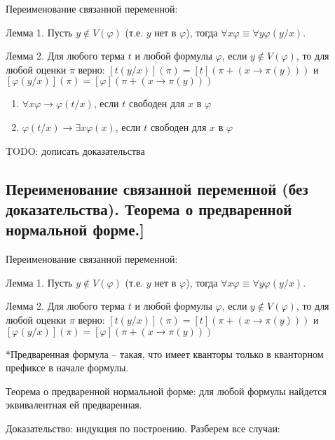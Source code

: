 \documentclass[a4paper, 10pt]{article}
\begin{document}
\hfill

Переименование связанной переменной:

Лемма 1. Пусть $y\not\in V(\varphi)$ (т.е. $y$ нет в $\varphi$), тогда $\forall x\varphi \equiv \forall y\varphi(y/x)$.

Лемма 2. Для любого терма $t$ и любой формулы $\varphi$, если $y \not\in V(\varphi)$, то для любой оценки $\pi$ верно: $[t(y/x)](\pi)=[t](\pi + (x \to \pi(y)))$ и $[\varphi(y/x)](\pi)=[\varphi](\pi + (x \to \pi(y)))$

\hfill

\begin{enumerate}
    \item $\forall x\varphi \to \varphi(t/x)$, если $t$ свободен для $x$ в $\varphi$
    \item $\varphi(t/x) \to \exists x \varphi(x)$, если $t$ свободен для $x$ в $\varphi$
\end{enumerate}

\hfill

TODO: дописать доказательства

\subsection{Переименование связанной переменной (без доказательства). Теорема о предваренной нормальной форме.]}

Переименование связанной переменной:

Лемма 1. Пусть $y\not\in V(\varphi)$ (т.е. $y$ нет в $\varphi$), тогда $\forall x\varphi \equiv \forall y\varphi(y/x)$.

Лемма 2. Для любого терма $t$ и любой формулы $\varphi$, если $y \not\in V(\varphi)$, то для любой оценки $\pi$ верно: $[t(y/x)](\pi)=[t](\pi + (x \to \pi(y)))$ и $[\varphi(y/x)](\pi)=[\varphi](\pi + (x \to \pi(y)))$

\hfill

*Предваренная формула -- такая, что имеет кванторы только в кванторном префиксе в начале формулы.

Теорема о предваренной нормальной форме: для любой формулы найдется эквивалентная ей предваренная.

Доказательство: индукция по построению. Разберем все случаи:
\end{document}
